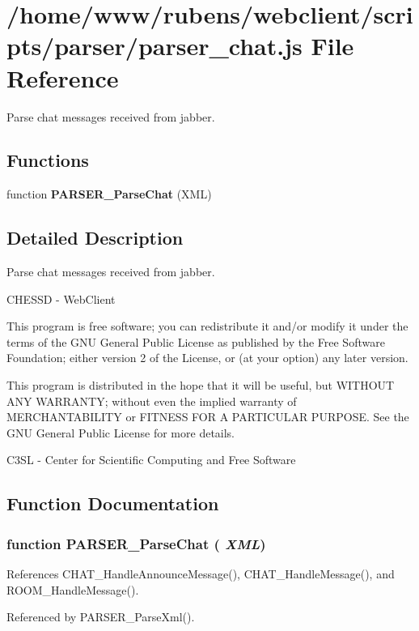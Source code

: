 \section{/home/www/rubens/webclient/scripts/parser/parser\_\-chat.js File Reference}
\label{parser__chat_8js}
Parse chat messages received from jabber. 

\subsection*{Functions}
\begin{CompactItemize}
\item 
function {\bf PARSER\_\-ParseChat} (XML)
\end{CompactItemize}


\subsection{Detailed Description}
Parse chat messages received from jabber. 

CHESSD - WebClient

This program is free software; you can redistribute it and/or modify it under the terms of the GNU General Public License as published by the Free Software Foundation; either version 2 of the License, or (at your option) any later version.

This program is distributed in the hope that it will be useful, but WITHOUT ANY WARRANTY; without even the implied warranty of MERCHANTABILITY or FITNESS FOR A PARTICULAR PURPOSE. See the GNU General Public License for more details.

C3SL - Center for Scientific Computing and Free Software 

\subsection{Function Documentation}
\subsubsection[PARSER\_\-ParseChat]{\setlength{\rightskip}{0pt plus 5cm}function PARSER\_\-ParseChat ( {\em XML})}\label{parser__chat_8js_08b86d178b23f7e7184bbe27c0ab9a13}




References CHAT\_\-HandleAnnounceMessage(), CHAT\_\-HandleMessage(), and ROOM\_\-HandleMessage().

Referenced by PARSER\_\-ParseXml().